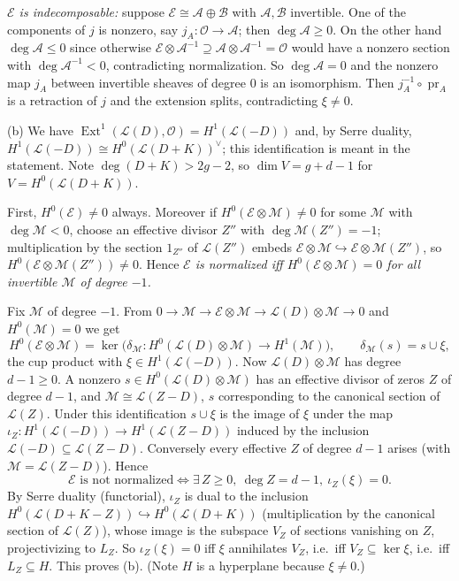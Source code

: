 \documentclass[11pt]{article}
\begin{document}
\emph{$\mathcal E$ is indecomposable:} suppose $\mathcal E\cong\mathcal A\oplus\mathcal B$ with $\mathcal A,\mathcal B$ invertible. One of the components of $j$ is nonzero, say $j_A\colon\mathcal O\to\mathcal A$; then $\deg\mathcal A\ge0$. On the other hand $\deg\mathcal A\le0$ since otherwise $\mathcal E\otimes\mathcal A^{-1}\supseteq\mathcal A\otimes\mathcal A^{-1}=\mathcal O$ would have a nonzero section with $\deg\mathcal A^{-1}<0$, contradicting normalization. So $\deg\mathcal A=0$ and the nonzero map $j_A$ between invertible sheaves of degree $0$ is an isomorphism. Then $j_A^{-1}\circ\operatorname{pr}_A$ is a retraction of $j$ and the extension splits, contradicting $\xi\ne0$.

(b) We have $\operatorname{Ext}^1(\mathcal L(D),\mathcal O)=H^1(\mathcal L(-D))$ and, by Serre duality, $H^1(\mathcal L(-D))\cong H^0(\mathcal L(D+K))^\vee$; this identification is meant in the statement. Note $\deg(D+K)>2g-2$, so $\dim V=g+d-1$ for $V=H^0(\mathcal L(D+K))$.

First, $H^0(\mathcal E)\ne0$ always. Moreover if $H^0(\mathcal E\otimes\mathcal M)\ne0$ for some $\mathcal M$ with $\deg\mathcal M<0$, choose an effective divisor $Z''$ with $\deg\mathcal M(Z'')=-1$; multiplication by the section $1_{Z''}$ of $\mathcal L(Z'')$ embeds $\mathcal E\otimes\mathcal M\hookrightarrow\mathcal E\otimes\mathcal M(Z'')$, so $H^0(\mathcal E\otimes\mathcal M(Z''))\ne0$. Hence \emph{$\mathcal E$ is normalized iff $H^0(\mathcal E\otimes\mathcal M)=0$ for all invertible $\mathcal M$ of degree $-1$.}

Fix $\mathcal M$ of degree $-1$. From $0\to\mathcal M\to\mathcal E\otimes\mathcal M\to\mathcal L(D)\otimes\mathcal M\to0$ and $H^0(\mathcal M)=0$ we get
\[ H^0(\mathcal E\otimes\mathcal M)=\ker\bigl(\delta_{\mathcal M}\colon H^0(\mathcal L(D)\otimes\mathcal M)\to H^1(\mathcal M)\bigr),\qquad \delta_{\mathcal M}(s)=s\cup\xi , \]
the cup product with $\xi\in H^1(\mathcal L(-D))$. Now $\mathcal L(D)\otimes\mathcal M$ has degree $d-1\ge0$. A nonzero $s\in H^0(\mathcal L(D)\otimes\mathcal M)$ has an effective divisor of zeros $Z$ of degree $d-1$, and $\mathcal M\cong\mathcal L(Z-D)$, $s$ corresponding to the canonical section of $\mathcal L(Z)$. Under this identification $s\cup\xi$ is the image of $\xi$ under the map $\iota_Z\colon H^1(\mathcal L(-D))\to H^1(\mathcal L(Z-D))$ induced by the inclusion $\mathcal L(-D)\subseteq\mathcal L(Z-D)$. Conversely every effective $Z$ of degree $d-1$ arises (with $\mathcal M=\mathcal L(Z-D)$). Hence
\[ \mathcal E\text{ is not normalized}\iff\exists\,Z\ge0,\ \deg Z=d-1,\ \iota_Z(\xi)=0 . \]
By Serre duality (functorial), $\iota_Z$ is dual to the inclusion $H^0(\mathcal L(D+K-Z))\hookrightarrow H^0(\mathcal L(D+K))$ (multiplication by the canonical section of $\mathcal L(Z)$), whose image is the subspace $V_Z$ of sections vanishing on $Z$, projectivizing to $L_Z$. So $\iota_Z(\xi)=0$ iff $\xi$ annihilates $V_Z$, i.e.\ iff $V_Z\subseteq\ker\xi$, i.e.\ iff $L_Z\subseteq H$. This proves (b). (Note $H$ is a hyperplane because $\xi\ne0$.)
\end{document}
